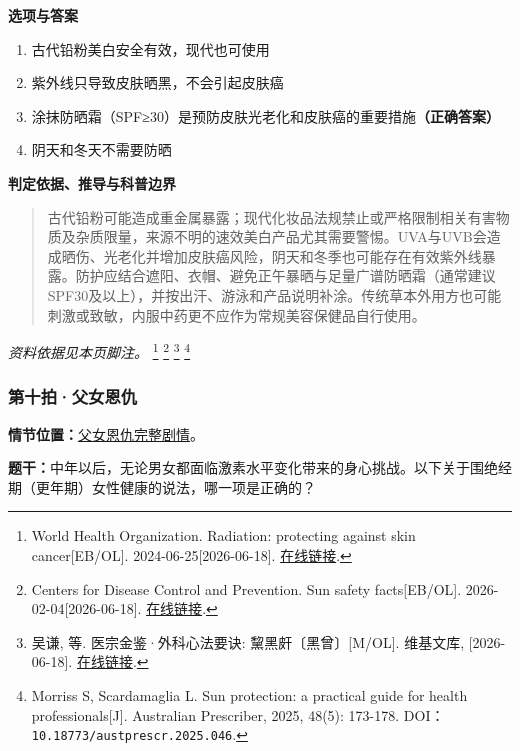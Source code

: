 \textbf{选项与答案}
\begin{enumerate}[label=\Alph*.,leftmargin=*]
  \item 古代铅粉美白安全有效，现代也可使用
  \item 紫外线只导致皮肤晒黑，不会引起皮肤癌
  \item 涂抹防晒霜（SPF≥30）是预防皮肤光老化和皮肤癌的重要措施\textbf{（正确答案）}
  \item 阴天和冬天不需要防晒
\end{enumerate}
\textbf{判定依据、推导与科普边界}
\begin{quote}古代铅粉可能造成重金属暴露；现代化妆品法规禁止或严格限制相关有害物质及杂质限量，来源不明的速效美白产品尤其需要警惕。UVA与UVB会造成晒伤、光老化并增加皮肤癌风险，阴天和冬季也可能存在有效紫外线暴露。防护应结合遮阳、衣帽、避免正午暴晒与足量广谱防晒霜（通常建议SPF30及以上），并按出汗、游泳和产品说明补涂。传统草本外用方也可能刺激或致敏，内服中药更不应作为常规美容保健品自行使用。\end{quote}
\noindent\textit{资料依据见本页脚注。}
\footnote{World Health Organization. Radiation: protecting against skin cancer[EB/OL]. 2024-06-25[2026-06-18]. \href{https://www.who.int/news-room/questions-and-answers/item/radiation-protecting-against-skin-cancer}{在线链接}.}
\footnote{Centers for Disease Control and Prevention. Sun safety facts[EB/OL]. 2026-02-04[2026-06-18]. \href{https://www.cdc.gov/skin-cancer/sun-safety/index.html}{在线链接}.}
\footnote{吴谦, 等. 医宗金鉴·外科心法要诀: 黧黑皯〔黑曾〕[M/OL]. 维基文库, [2026-06-18]. \href{https://zh.wikisource.org/zh-hans/醫宗金鑒/外科卷上}{在线链接}.}
\footnote{Morriss S, Scardamaglia L. Sun protection: a practical guide for health professionals[J]. Australian Prescriber, 2025, 48(5): 173-178. DOI：\nolinkurl{10.18773/austprescr.2025.046}.}

\subsubsection{第十拍·父女恩仇}\label{question:zhaomin:10}
\textbf{情节位置：}\hyperref[plot:zhaomin:10]{父女恩仇完整剧情}。

\textbf{题干：}中年以后，无论男女都面临激素水平变化带来的身心挑战。以下关于围绝经期（更年期）女性健康的说法，哪一项是正确的？

